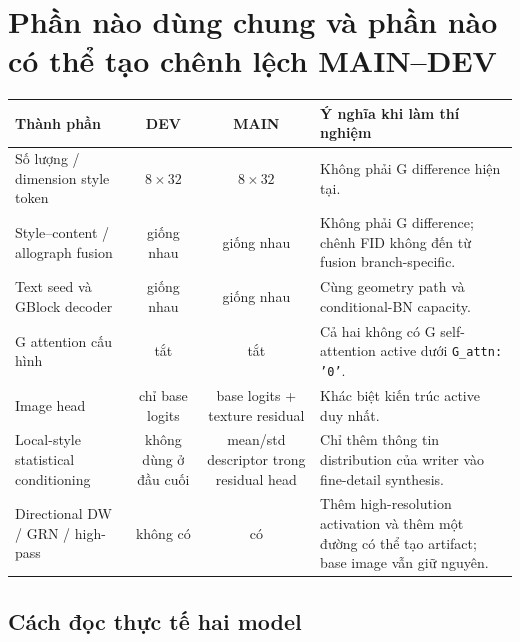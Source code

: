 \documentclass[10pt,a4paper]{article}
\newcommand{\dev}{\textcolor{blue!65!black}{\textbf{DEV}}}
\newcommand{\mainbranch}{\textcolor{orange!55!black}{\textbf{MAIN}}}
\begin{document}
\section{Phần nào dùng chung và phần nào có thể tạo chênh lệch MAIN--DEV}

\begin{center}
\small
\begin{tabularx}{\textwidth}{@{}p{}c c X@{}}
\toprule
Thành phần & \dev{} & \mainbranch{} & Ý nghĩa khi làm thí nghiệm \\
\midrule
Số lượng / dimension style token & $8\times32$ & $8\times32$ & Không phải G difference hiện tại. \\
Style--content / allograph fusion & giống nhau & giống nhau & Không phải G difference; chênh FID không đến từ fusion branch-specific. \\
Text seed và GBlock decoder & giống nhau & giống nhau & Cùng geometry path và conditional-BN capacity. \\
G attention cấu hình & tắt & tắt & Cả hai không có G self-attention active dưới \texttt{G\_attn: '0'}. \\
Image head & chỉ base logits & base logits + texture residual & Khác biệt kiến trúc active duy nhất. \\
Local-style statistical conditioning & không dùng ở đầu cuối & mean/std descriptor trong residual head & Chỉ thêm thông tin distribution của writer vào fine-detail synthesis. \\
Directional DW / GRN / high-pass & không có & có & Thêm high-resolution activation và thêm một đường có thể tạo artifact; base image vẫn giữ nguyên. \\
\bottomrule
\end{tabularx}
\end{center}

\subsection*{Cách đọc thực tế hai model}
\end{document}
